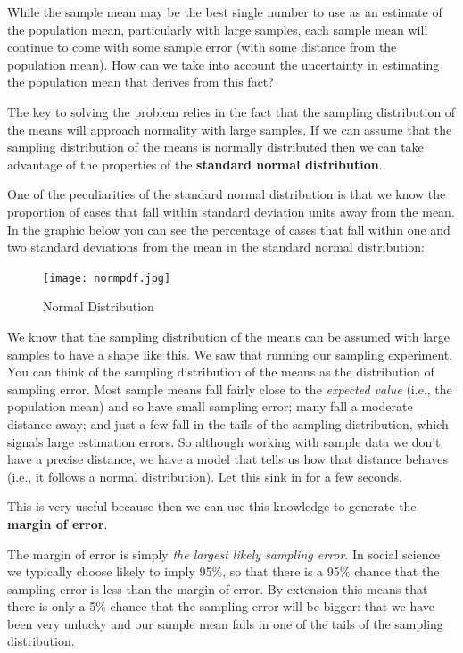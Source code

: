 \documentclass[]{book}
\theoremstyle{definition}
\theoremstyle{definition}
\theoremstyle{definition}
\theoremstyle{remark}
\begin{document}
While the sample mean may be the best single number to use as an
estimate of the population mean, particularly with large samples, each
sample mean will continue to come with some sample error (with some
distance from the population mean). How can we take into account the
uncertainty in estimating the population mean that derives from this
fact?

The key to solving the problem relies in the fact that the sampling
distribution of the means will approach normality with large samples. If
we can assume that the sampling distribution of the means is normally
distributed then we can take advantage of the properties of the
\textbf{standard normal distribution}.

One of the peculiarities of the standard normal distribution is that we
know the proportion of cases that fall within standard deviation units
away from the mean. In the graphic below you can see the percentage of
cases that fall within one and two standard deviations from the mean in
the standard normal distribution:

\begin{figure}
\centering
\texttt{[image: normpdf.jpg]}
\caption{Normal Distribution}
\end{figure}

We know that the sampling distribution of the means can be assumed with
large samples to have a shape like this. We saw that running our
sampling experiment. You can think of the sampling distribution of the
means as the distribution of sampling error. Most sample means fall
fairly close to the \emph{expected value} (i.e., the population mean)
and so have small sampling error; many fall a moderate distance away;
and just a few fall in the tails of the sampling distribution, which
signals large estimation errors. So although working with sample data we
don't have a precise distance, we have a model that tells us how that
distance behaves (i.e., it follows a normal distribution). Let this sink
in for a few seconds.

This is very useful because then we can use this knowledge to generate
the \textbf{margin of error}.

The margin of error is simply \emph{the largest likely sampling error}.
In social science we typically choose likely to imply 95\%, so that
there is a 95\% chance that the sampling error is less than the margin
of error. By extension this means that there is only a 5\% chance that
the sampling error will be bigger: that we have been very unlucky and
our sample mean falls in one of the tails of the sampling distribution.
\end{document}
